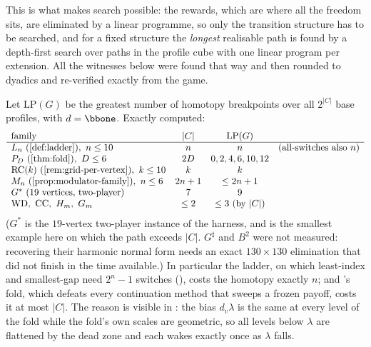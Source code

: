 This is what makes search possible: the rewards, which are where all the
freedom sits, are eliminated by a linear programme, so only the transition
structure has to be searched, and for a fixed structure the \emph{longest}
realisable path is found by a depth-first search over paths in the profile
cube with one linear program per extension. All the witnesses below were found
that way and then rounded to dyadics and re-verified exactly from the game.

\begin{proposition}\label{fsa:families}
Let $\mathrm{LP}(G)$ be the greatest number of homotopy breakpoints over all
$2^{|C|}$ base profiles, with $d=\bbone$. Exactly computed:
\[
\begin{array}{lccl}
\text{family} & |C| & \mathrm{LP}(G) & \\\hline
L_n\ (\Cref{def:ladder}),\ n\le10 & n & n & \text{(all-switches also }n)\\
P_D\ (\Cref{thm:fold}),\ D\le6 & 2D & 0,2,4,6,10,12 & \\
\mathrm{RC}(k)\ (\Cref{rem:grid-per-vertex}),\ k\le10 & k & k & \\
M_n\ (\Cref{prop:modulator-family}),\ n\le6 & 2n+1 & \le2n+1 & \\
G^{\ast}\ (19\text{ vertices, two-player}) & 7 & 9 &\\
\mathrm{WD},\ \mathrm{CC},\ H_m,\ G_m & \le2 & \le3\ \text{(by }|C|)&
\end{array}
\]
($G^{\ast}$ is the $19$-vertex two-player instance of the harness, and is the
smallest example here on which the path exceeds $|C|$. $G^{\sharp}$ and
$B^{2}$ were not measured: recovering their harmonic normal form needs an
exact $130\times130$ elimination that did not finish in the time available.)
In particular the ladder, on which least-index and smallest-gap need
$2^{n}-1$ switches (), costs the homotopy exactly $n$; and
's fold, which defeats every continuation method that sweeps a
frozen payoff, costs it at most $|C|$. The reason is visible in
: the bias $d_v\lambda$ is the same at every level of the
fold while the fold's own scales are geometric, so all levels below $\lambda$
are flattened by the dead zone and each wakes exactly once as $\lambda$ falls.
\end{proposition}

